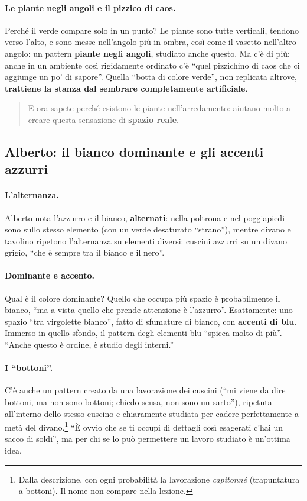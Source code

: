 \paragraph{Le piante negli angoli e il pizzico di caos.} Perché il verde compare solo in
un punto? Le piante sono tutte verticali, tendono verso l'alto, e sono messe nell'angolo
più in ombra, così come il vasetto nell'altro angolo: un pattern \textbf{piante negli
angoli}, studiato anche questo. Ma c'è di più: anche in un ambiente così rigidamente
ordinato c'è ``quel pizzichino di caos che ci aggiunge un po' di sapore''. Quella
``botta di colore verde'', non replicata altrove, \textbf{trattiene la stanza dal
sembrare completamente artificiale}.
\begin{quote}
E ora sapete perché esistono le piante nell'arredamento: aiutano molto a creare questa
sensazione di \textbf{spazio reale}.
\end{quote}

\subsection{Alberto: il bianco dominante e gli accenti azzurri}

\paragraph{L'alternanza.} Alberto nota l'azzurro e il bianco, \textbf{alternati}: nella
poltrona e nel poggiapiedi sono sullo stesso elemento (con un verde desaturato ``strano''),
mentre divano e tavolino ripetono l'alternanza su elementi diversi: cuscini azzurri su
un divano grigio, ``che è sempre tra il bianco e il nero''.

\paragraph{Dominante e accento.} Qual è il colore dominante? Quello che occupa più
spazio è probabilmente il bianco, ``ma a vista quello che prende attenzione è
l'azzurro''. Esattamente: uno spazio ``tra virgolette bianco'', fatto di sfumature di
bianco, con \textbf{accenti di blu}. Immerso in quello sfondo, il pattern degli
elementi blu ``spicca molto di più''. ``Anche questo è ordine, è studio degli interni.''

\paragraph{I ``bottoni''.} C'è anche un pattern creato da una lavorazione dei cuscini
(``mi viene da dire bottoni, ma non sono bottoni; chiedo scusa, non sono un sarto''),
ripetuta all'interno dello stesso cuscino e chiaramente studiata per cadere
perfettamente a metà del divano.\footnote{Dalla descrizione, con ogni probabilità la
lavorazione \emph{capitonné} (trapuntatura a bottoni). Il nome non compare nella
lezione.} ``È ovvio che se ti occupi di dettagli così esagerati c'hai un sacco di
soldi'', ma per chi se lo può permettere un lavoro studiato è un'ottima idea.

